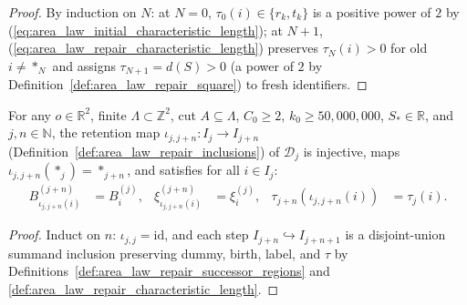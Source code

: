 \begin{proof}
    \leanok
    By induction on $N$: at $N=0$, $\tau_0(i)\in\{r_k,t_k\}$ is a positive power of $2$ by
    (\ref{eq:area_law_initial_characteristic_length}); at $N+1$, (\ref{eq:area_law_repair_characteristic_length})
    preserves $\tau_N(i)>0$ for old $i\ne *_N$ and assigns $\tau_{N+1}=d(S)>0$ (a power of $2$ by
    Definition~\ref{def:area_law_repair_square}) to fresh identifiers.
\end{proof}


\begin{lemma}
    \label{lem:area_law_repair_retention_identities}
    \leanok
    For any $o\in\mathbb R^2$, finite $\Lambda\subset\mathbb Z^2$, cut $A\subseteq\Lambda$,
    $C_0\ge2$, $k_0\ge50{,}000{,}000$, $S_*\in\mathbb R$, and $j,n\in\mathbb N$, the retention map
    $\iota_{j,j+n}:I_j\to I_{j+n}$ (Definition~\ref{def:area_law_repair_inclusions}) of $\mathcal D_j$
    is injective, maps $\iota_{j,j+n}(*_j)=*_{j+n}$, and satisfies for all $i\in I_j$:
    \begin{align}
        B^{(j+n)}_{\iota_{j,j+n}(i)}   & =B^{(j)}_i,   &
        \xi^{(j+n)}_{\iota_{j,j+n}(i)} & =\xi^{(j)}_i, &
        \tau_{j+n}(\iota_{j,j+n}(i))   & =\tau_j(i).
        \label{eq:area_law_repair_retention_identities}
    \end{align}
\end{lemma}

\begin{proof}
    \leanok
    Induct on $n$: $\iota_{j,j}=\mathrm{id}$, and each step $I_{j+n}\hookrightarrow I_{j+n+1}$
    is a disjoint-union summand inclusion preserving dummy, birth, label, and $\tau$ by
    Definitions~\ref{def:area_law_repair_successor_regions} and
    \ref{def:area_law_repair_characteristic_length}.
\end{proof}


